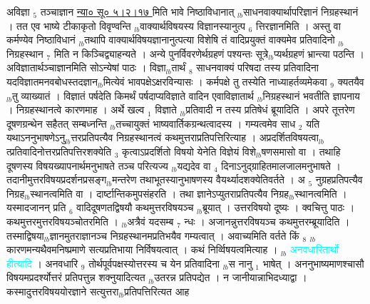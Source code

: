 \documentclass[article,12pt,a4paper]{memoir}%
\newcommand{\quotelemma}[1]{\textcolor{cyan}{#1}}
\begin{document}
	  
	  \pstart \leavevmode%
	अविज्ञा {\tiny $_{5}$} तञ्चाज्ञान \href{http://sarit.indology.info/?cref=ns\%C5\%AB.5.2.17}{न्या० सू० ५।२।१७ } मिति भावे निष्ठाविधानात् {\tiny $_{lb}$}साधनवाक्यार्थापरिज्ञानं निग्रहस्थानं । तत एव भाष्ये टीकाकृतो विवृण्वन्ति {\tiny $_{lb}$}वाक्यार्थविषयस्य विज्ञानस्यानुत्प {\tiny $_{6}$} त्तिरज्ञानमिति । अस्तु वा कर्मण्येव निष्ठाविधानं {\tiny $_{lb}$}तथापि वाक्यार्थविषयज्ञानानुत्पत्या विशेषि तं वादिप्रयुक्तं वाक्यमेव प्रतिवादिनो {\tiny $_{lb}$}निग्रहस्थान {\tiny $_{7}$} मिति न किञ्चिद्व्याहन्यते । अन्ये पुनर्विवरणेर्थग्रहणं पश्यन्तः सूत्रे{\tiny $_{lb}$}प्यर्थग्रहणं भ्रान्त्या पठन्ति । अविज्ञातार्थञ्चाज्ञानमिति सोऽन्येषां पाठः । विज्ञा{\tiny $_{lb}$}तार्थं {\tiny $_{8}$} साधनवाक्यं परिषदा तस्य प्रतिवादिना यदविज्ञातमनवबोधस्तदज्ञान{\tiny $_{lb}$}मित्येवं भावपक्षेऽक्षरविन्यासः । कर्मपक्षे तु तस्येति नाध्याहर्तव्यमेकवा {\tiny $_{9}$} \leavevmode{} क्यतयैव {\tiny $_{lb}$}तु व्याख्यातं । विज्ञातं पर्षदेति किमर्थं पर्षदाप्यविज्ञाते वादिन एवाविज्ञातार्थ {\tiny $_{lb}$}निग्रहस्थानं भवतीति ज्ञापनाय । निग्रहस्थानत्वे कारणमाह । अर्थे खल्व {\tiny $_{1}$} विज्ञाते {\tiny $_{lb}$}प्रतिवादी न तस्य प्रतिषेधं ब्रूयादिति । अपरे तूत्तरेण दूषणग्रन्थेन सहैतत् सम्बध्नन्ति {\tiny $_{lb}$}तच्चायुक्तं भाष्यवार्तिकग्रन्थत्वादस्य । गम्यत्वमेव साध {\tiny $_{2}$} यति यथाऽननुभाषणेऽनु{\tiny $_{lb}$}त्तरप्रतिपत्यैव निग्रहस्थानत्वं कथमुत्तराप्रतिपत्तिरित्याह । अप्रदर्शितविषयत्वा{\tiny $_{lb}$}त्प्रतिवादिनोत्तरप्रतिपत्तिरशक्येति {\tiny $_{3}$} कृत्वाऽप्रदर्शितो विषयो येनेति विज्ञेयं विशे{\tiny $_{lb}$}षणसमासो वा । तथाहि दूषणस्य विषयख्यापनार्थमनुभाषते तञ्च परित्यज्य {\tiny $_{lb}$}यद्यदेव वा {\tiny $_{4}$} दिनाऽनुद्ग्राहितमालजालमनुभाषते । तदानीमुत्तरविषयप्रदर्शनप्रसङ्ग{\tiny $_{lb}$}मन्तरेण तथाभूतस्यानुभाषणस्य वैयर्थ्यादशक्येतिवर्तते । अ {\tiny $_{5}$} नुग्रहप्रतिपत्यैव निग्रह{\tiny $_{lb}$}स्थानत्वमिति वा । दार्ष्टान्तिकमुपसंहरति । तथा ज्ञानेऽप्युतराप्रतिपत्यैव निग्रह{\tiny $_{lb}$}स्थानत्वमिति । यस्मादजानन् प्रति {\tiny $_{6}$} वादिदूषणतद्विषयौ कथमुत्तरविषयञ्च {\tiny $_{lb}$}ब्रूयात् । उत्तरविषयो दूष्यः । क्वचित्तु पाठः । कथमुत्तरमुत्तरविषयञ्चोतरमिति । {\tiny $_{lb}$}अत्रैवं यदसम्ब {\tiny $_{7}$} न्धः । अजानन्नुत्तरविषयञ्च कथमुत्तरम्ब्रूयादिति । तस्माद्विषया{\tiny $_{lb}$}ज्ञानमुतराज्ञानञ्च निग्रहस्थानमप्रतिभयैव गम्यत्वात् । अवाच्यमिति वर्तते किं {\tiny $_{8}$} {\tiny $_{lb}$}कारणमन्यथैवमनिष्प्रमाणे सत्यप्रतिभाया निर्विषयत्वात् । कथं निर्व्विषयत्वमित्याह । {\tiny $_{lb}$} \leavevmode{} \quotelemma{अनवधारितार्थो हीत्यादि} । अनवधारि {\tiny $_{9}$} \leavevmode{} तोर्थपूर्वपक्षस्योत्तरस्य च येन प्रतिवादिना {\tiny $_{lb}$}स नानु {\tiny $_{1}$} भाषेत् । अननुभाष्यमाणश्चासौ विषयमप्रदर्श्योत्तरं प्रतिपत्तुन्न शक्नुयादित्यत {\tiny $_{lb}$}उतरन्न प्रतिपद्येत । न जानीयान्नाभिदध्याद्वा । कस्मादुत्तरविषययोरज्ञाने सत्युत्तरा{\tiny $_{lb}$}प्रतिपत्तिरित्यत आह 
\end{document}
